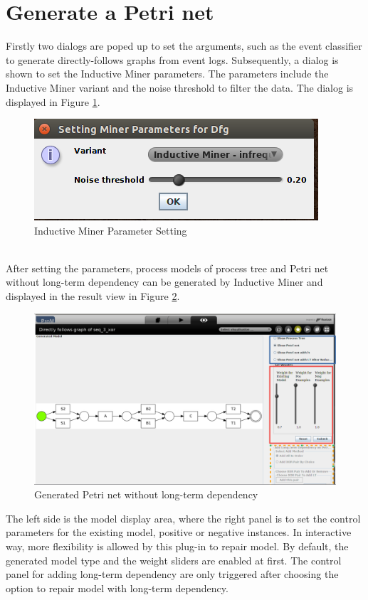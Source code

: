 \section{Generate a Petri net}
Firstly two dialogs are poped up to set the arguments, such as the event classifier to  generate directly-follows graphs from event logs. Subsequently, a dialog is shown to set the Inductive Miner parameters. The parameters include the Inductive Miner variant and the noise threshold to filter the data. The dialog is displayed in Figure \ref{fig:dfg-IM-setting}.
\begin{figure}
	\centering
	\includegraphics[scale=0.75]{figures/implementation/dfg-IM-setting.png}
	\caption{Inductive Miner Parameter Setting}
	\label{fig:dfg-IM-setting}
\end{figure} \\
After setting the parameters, process models  of process tree and Petri net without long-term dependency can be generated by Inductive Miner and displayed in the result view in Figure \ref{fig:dfg-IM-pn-without-lt}. 
\begin{figure}
	\centering
	\includegraphics[width=\textwidth]{figures/implementation/dfg-IM-pn-without-lt.png}
	\caption{Generated Petri net without long-term dependency}
	\label{fig:dfg-IM-pn-without-lt}
\end{figure}
The left side is the model display area, where the right panel is to set the control parameters for the existing model, positive or negative instances. In interactive way, more flexibility is allowed by this plug-in to repair model. By default, the generated model type and the weight sliders are enabled at first. The control panel for adding long-term dependency are only triggered after choosing the option to repair model with long-term dependency. 

